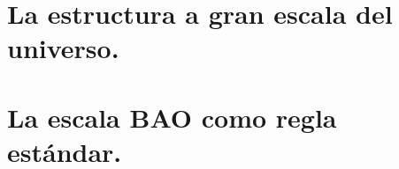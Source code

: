 \section{La estructura a gran escala del universo.}

\section{La escala BAO como regla estándar.}





%
%
%
%
